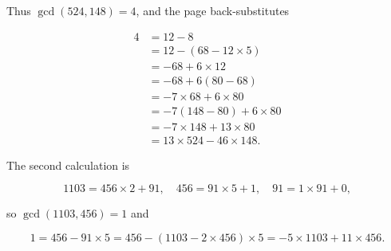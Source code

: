 Thus \(\gcd\left( {524,148} \right) = 4\), and the page back-substitutes

\[\begin{matrix}
4 & {= 12 - 8} \\
 & {= 12 - \left( {68 - 12 \times 5} \right)} \\
 & {= - 68 + 6 \times 12} \\
 & {= - 68 + 6\left( {80 - 68} \right)} \\
 & {= - 7 \times 68 + 6 \times 80} \\
 & {= - 7\left( {148 - 80} \right) + 6 \times 80} \\
 & {= - 7 \times 148 + 13 \times 80} \\
 & {= 13 \times 524 - 46 \times 148.}
\end{matrix}\]

The second calculation is

\[1103 = 456 \times 2 + 91,\quad 456 = 91 \times 5 + 1,\quad 91 = 1 \times 91 + 0,\]

so \(\gcd\left( {1103,456} \right) = 1\) and

\[1 = 456 - 91 \times 5 = 456 - \left( {1103 - 2 \times 456} \right) \times 5 = - 5 \times 1103 + 11 \times 456.\]
